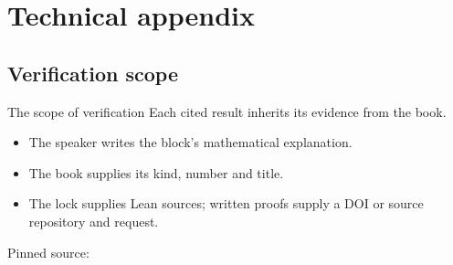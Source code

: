 \documentclass{beamer}
\begin{document}
\section{Technical appendix}
\subsection{Verification scope}
\begin{frame}{The scope of verification}
  Each cited result inherits its evidence from the book.
  \begin{itemize}
    \item The speaker writes the block's mathematical explanation.
    \item The book supplies its kind, number and title.
    \item The lock supplies Lean sources; written proofs supply a DOI or source repository and request.
  \end{itemize}
  Pinned source: \PinnedCommit
\end{frame}
\FormalVerification
\end{document}
